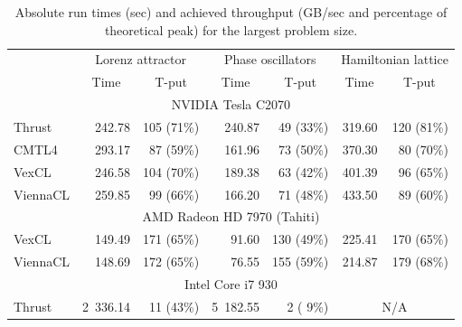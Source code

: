 \documentclass[final]{siamltex}
\begin{document}
\begin{table}
    \begin{small}
    \caption{Absolute run times (sec) and achieved throughput (GB/sec and
    percentage of theoretical peak) for the largest problem size.}
    \label{tab:abstimes}
    \begin{tabular}{|l|rrrrrr|}
        \hline
        & \multicolumn{2}{|c|}{Lorenz attractor}
        & \multicolumn{2}{|c|}{Phase oscillators}
        & \multicolumn{2}{|c|}{Hamiltonian lattice} \\
        \cline{2-7}
        & \multicolumn{1}{c}{Time} & \multicolumn{1}{|c|}{T-put}
        & \multicolumn{1}{c}{Time} & \multicolumn{1}{|c|}{T-put}
        & \multicolumn{1}{c}{Time} & \multicolumn{1}{|c|}{T-put} \\
        \hline
        \multicolumn{7}{|c|}{NVIDIA Tesla C2070} \\
        \hline
        Thrust           &   242.78 & 105 (71\%) &   240.87 &  49 (33\%) &  319.60 & 120 (81\%) \\
        CMTL4            &   293.17 &  87 (59\%) &   161.96 &  73 (50\%) &  370.30 &  80 (70\%) \\
        VexCL            &   246.58 & 104 (70\%) &   189.38 &  63 (42\%) &  401.39 &  96 (65\%) \\
        ViennaCL         &   259.85 &  99 (66\%) &   166.20 &  71 (48\%) &  433.50 &  89 (60\%) \\
        \hline
        \multicolumn{7}{|c|}{AMD Radeon HD 7970 (Tahiti)} \\
        \hline
        VexCL            &   149.49 & 171 (65\%) &    91.60 & 130 (49\%) &  225.41 & 170 (65\%) \\
        ViennaCL         &   148.69 & 172 (65\%) &    76.55 & 155 (59\%) &  214.87 & 179 (68\%) \\
        \hline
        \multicolumn{7}{|c|}{Intel Core i7 930} \\
        \hline
        Thrust           & 2~336.14 &  11 (43\%) & 5~182.55 &   2 ( 9\%) & \multicolumn{2}{c|}{N/A} \\

\end{tabular}
\end{small}
\end{table}
\end{document}
